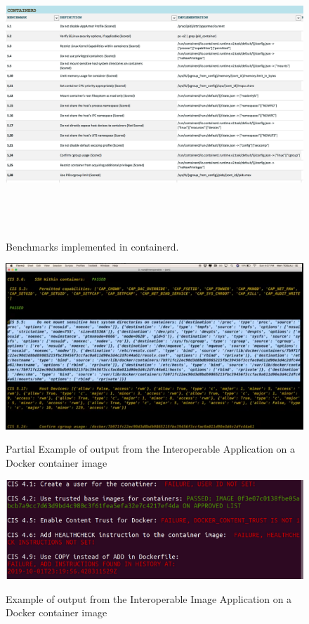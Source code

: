 \documentclass[times, twoside, watermark]{zHenriquesLab-StyleBioRxiv}
\begin{document}
  \begin{figure}
    \caption{Benchmarks implemented in containerd.}
    \centering
      \includegraphics[width=\textwidth,height=10cm]{figures/containerd}
      \label{fig:containerd}
  \end{figure}
  
  \begin{figure}
    \caption{Partial Example of output from the Interoperable Application on a Docker container image}
    \centering
      \includegraphics[]{figures/docker_interop_example.png}
      \label{fig:containerd}
  \end{figure}

    \begin{figure}
    \caption{Example of output from the Interoperable Image Application on a Docker container image}
    \centering
      \includegraphics[]{figures/docker_interop_image_example.png}
      \label{fig:containerd}
  \end{figure}
\end{document}

